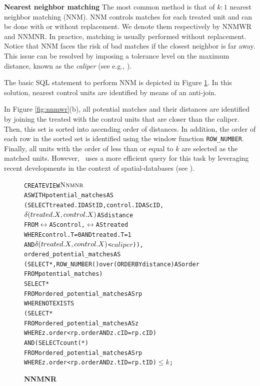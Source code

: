 {\bf Nearest neighbor matching}
\label{sec:nnm}
The most common method is that of $k:1$ nearest neighbor
matching (NNM). NNM controls matches for each treated
unit and can be done with or without replacement. We denote
them respectively by NNMWR and NNMNR. In practice, matching is usually
performed without replacement.  Notice that NNM faces the risk of bad
matches if the closest neighbor is far away. This issue can be
resolved by imposing a tolerance level on the maximum distance, known
as the {\em caliper} (see e.g., \cite{lunt2014selecting}). 

The basic SQL statement to perform NNM
is depicted in Figure \ref{fig:nnmnr}. In this solution, nearest control units are identified by means of an anti-join.   In Figure \ref{fig:nnmwr}(b), all potential matches and their distances are identified by
joining the treated with the control units that are closer than
the caliper. Then, this set is sorted into ascending order of
distances.  In addition, the order of each row in the sorted set is identified
using the window function {\verb|ROW_NUMBER|}. Finally, all units with the order of less than or equal to $k$ are selected as the matched units.
However, \GSQL\  uses a more efficient query for this task by leveraging recent developments in the context of spatial-databases
(see \cite{obe2015postgis}).



\begin{figure}
  \centering
\begin{alltt} \scriptsize
CREATE VIEW \(\nnmnr\)
AS WITH potential_matches AS
  (SELECT treated.ID AS tID, control.ID AS cID,
          \(\delta(treated.\cv,control.\cv)\)  AS distance
   FROM \(\rel\) AS control, \(\rel\) AS treated
   WHERE control.T=0 AND treated.T=1
     AND \(\delta(treated.\cv,control.\cv)\) < \(caliper\))),
            ordered_potential_matches AS
  (SELECT *, ROW_NUMBER() over (ORDER BY distance) AS order
   FROM potential_matches)
SELECT *
FROM ordered_potential_matches AS rp
WHERE NOT EXISTS
    (SELECT *
     FROM ordered_potential_matches AS z
     WHERE z.order < rp.order AND z.cID=rp.cID)
  AND (SELECT count(*)
     FROM ordered_potential_matches AS rp
     WHERE z.order < rp.order AND z.tID=rp.tID)\( \leq k\);
\end{alltt} \vspace{-.3cm}
  \caption{\bf NNMNR}\label{fig:nnmnr}
\end{figure}


